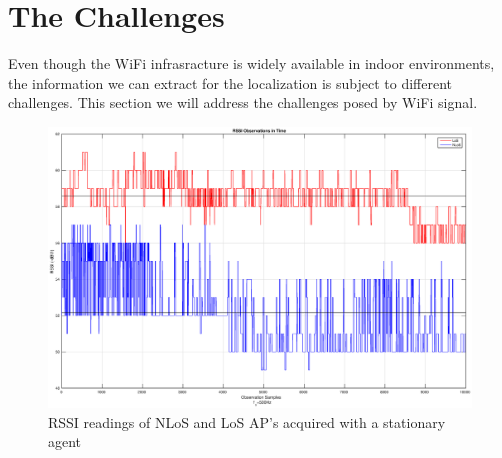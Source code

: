 \documentclass{article}
\begin{document}
\section{The Challenges}
    Even though the WiFi infrasracture is widely available in indoor environments, the information we can extract for the localization is subject to different challenges.
    This section we will address the challenges posed by WiFi signal.

    \begin{figure}[h]
       \centering
       \includegraphics[scale=0.4]{figures/rssi_variance.eps}
       \caption{\label{fig-variance}RSSI readings of NLoS and LoS AP's acquired with a stationary agent}
    \end{figure}

% 
% 
\end{document}
